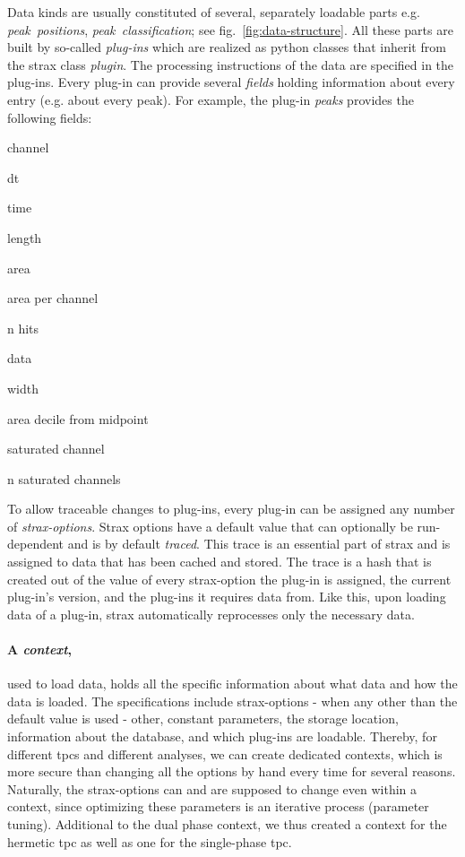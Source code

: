 Data kinds are usually constituted of several, separately loadable parts e.g. \emph{peak~positions}, \emph{peak~classification}; see fig.~\ref{fig:data-structure}.
All these parts are built by so-called \emph{plug-ins} which are realized as python classes that inherit from the strax class \emph{plugin}.
The processing instructions of the data are specified in the plug-ins.
Every plug-in can provide several \emph{fields} holding information about every entry (e.g. about every peak).
For example, the plug-in \emph{peaks} provides the following fields:
\begin{AutoMultiColItemize}
        \item{channel}
        \item{dt}
        \item{time}
        \item{length}
        \item{area}
        \item{area per channel}
        \item{n hits}
        \item{data}
        \item{width}
        \item{area decile from midpoint}
        \item{saturated channel}
        \item{n saturated channels}
\end{AutoMultiColItemize}
To allow traceable changes to plug-ins, every plug-in can be assigned any number of \emph{strax-options}.
Strax options have a default value that can optionally be run-dependent and is by default \emph{traced}.
This trace is an essential part of strax and is assigned to data that has been cached and stored.
The trace is a hash that is created out of the value of every strax-option the plug-in is assigned, the current plug-in's version, and the plug-ins it requires data from.
Like this, upon loading data of a plug-in, strax automatically reprocesses only the necessary data.


\paragraph{A \emph{context},} used to load data, holds all the specific information about what data and how the data is loaded.
The specifications include strax-options - when any other than the default value is used - other, constant parameters, the storage location, information about the database, and which plug-ins are loadable.
Thereby, for different \glspl{tpc} and different analyses, we can create dedicated contexts, which is more secure than changing all the options by hand every time for several reasons.
Naturally, the strax-options can and are supposed to change even within a context, since optimizing these parameters is an iterative process (parameter tuning).
Additional to the dual phase context, we thus created a context for the hermetic \gls{tpc} as well as one for the single-phase \gls{tpc}.

